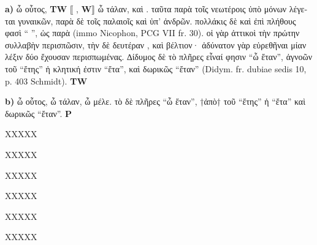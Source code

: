\documentclass[11pt,a4paper]{book}
\renewcommand{\ledsidenote}[1]{}
\begin{document}
\begin{greek}
\begin{pairs}
\begin{Leftside}
\resumenumbering
\numberpstartfalse
\pstart
\noindent\textbf{a)} ὦ οὗτος, \textbf{TW} ⟦%
,
\textbf{W}⟧ ὦ τάλαν, καὶ . ταῦτα παρὰ τοῖς νεωτέροις ὑπὸ
        μόνων λέγεται γυναικῶν, παρὰ δὲ τοῖς παλαιοῖς καὶ ὑπ'
        ἀνδρῶν. πολλάκις δὲ καὶ ἐπὶ πλήθους φασὶ “%
        ”, ὡς παρὰ
        (immo Nicophon, PCG VII fr. 30). οἱ γὰρ ἀττικοὶ τὴν
        πρώτην συλλαβὴν περισπῶσιν, τὴν δὲ δευτέραν
        , καὶ
        βέλτιον· ἀδύνατον γὰρ εὑρεθῆναι μίαν λέξιν δύο ἔχουσαν
        περισπωμένας. ∆ίδυμος δὲ τὸ πλῆρες εἶναί φησιν “ὦ ἔταν”,
        ἀγνοῶν
         τοῦ “ἔτης” ἡ κλητική ἐστιν
        “ἔτα”, καὶ δωρικῶς “ἔταν” (Didym. fr. dubiae sedis 10, p. 403 Schmidt). \textbf{TW}
\pend
\pausenumbering
\end{Leftside}

\begin{Rightside}
\resumenumbering
\numberpstartfalse
\pstart
\noindent\ledsidenote{Σ}\textbf{b)} ὦ οὗτος, ὦ τάλαν, ὦ μέλε. τὸ δὲ
        πλῆρες “ὦ ἔταν”, †ἀπὸ† τοῦ “ἔτης” ἡ  “ἔτα” καὶ δωρικῶς
        “ἔταν”. \textbf{P}\pend
\pausenumbering
\end{Rightside}
\end{pairs}
\Columns

\numberpstarttrue
\resumenumbering

\pstart XXXXX\pend

\pstart{}XXXXX\pend

\pstart{}XXXXX\pend

\pstart{}XXXXX\pend

\pstart{}XXXXX\pend

\pstart{}XXXXX\pend


\numberpstartfalse
\endnumbering

\end{greek}
\end{document}
